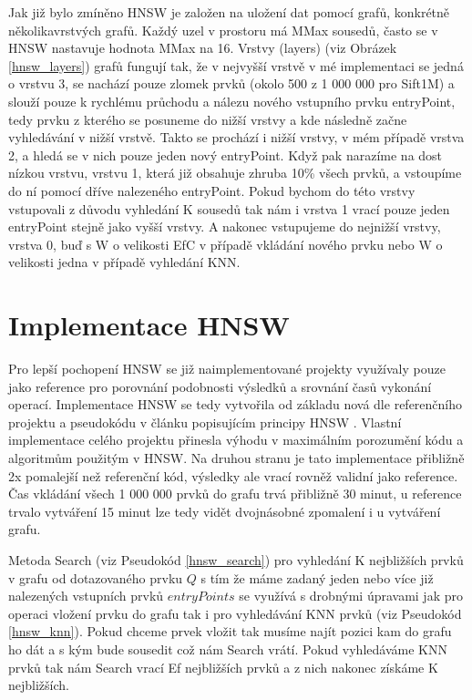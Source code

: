 \documentclass[czech,semestral,dept460,male,csharp,cpdeclaration]{diploma}
\begin{document}
		Jak již bylo zmíněno HNSW je založen na uložení dat pomocí grafů, konkrétně několikavrstvých grafů. Každý uzel v prostoru má MMax sousedů, často se v HNSW nastavuje hodnota MMax na 16. Vrstvy (layers) (viz Obrázek \ref{hnsw_layers}) grafů fungují tak, že v nejvyšší vrstvě v mé implementaci se jedná o vrstvu 3, se nachází pouze zlomek prvků (okolo 500 z 1 000 000 pro Sift1M) a slouží pouze k rychlému průchodu a nálezu nového vstupního prvku entryPoint, tedy prvku z kterého se posuneme do nižší vrstvy a kde následně začne vyhledávání v nižší vrstvě. Takto se prochází i nižší vrstvy, v mém případě vrstva 2, a hledá se v nich pouze jeden nový entryPoint. Když pak narazíme na dost nízkou vrstvu, vrstvu 1, která již obsahuje zhruba 10\% všech prvků, a vstoupíme do ní pomocí dříve nalezeného entryPoint. Pokud bychom do této vrstvy vstupovali z důvodu vyhledání K sousedů tak nám i vrstva 1 vrací pouze jeden entryPoint stejně jako vyšší vrstvy. A nakonec vstupujeme do nejnižší vrstvy, vrstva 0, buď s W o velikosti EfC v případě vkládání nového prvku nebo W o velikosti jedna v případě vyhledání KNN.
		
		\section{Implementace HNSW}
		
		Pro lepší pochopení HNSW se již naimplementované projekty \cite{git-hnswlib} \cite{git-hnsw} využívaly pouze jako reference pro porovnání podobnosti výsledků a srovnání časů vykonání operací. Implementace HNSW se tedy vytvořila od základu nová dle referenčního projektu a pseudokódu v článku popisujícím principy HNSW \cite{malkov2018efficient}. Vlastní implementace celého projektu přinesla výhodu v maximálním porozumění kódu a algoritmům použitým v HNSW. Na druhou stranu je tato implementace přibližně 2x pomalejší než referenční kód, výsledky ale vrací rovněž validní jako reference. Čas vkládání všech 1 000 000 prvků do grafu trvá přibližně 30 minut, u reference trvalo vytváření 15 minut lze tedy vidět dvojnásobné zpomalení i u vytváření grafu.
		
		\label{MS}
		Metoda Search (viz Pseudokód \ref{hnsw_search}) pro vyhledání K nejbližších prvků v grafu od dotazovaného prvku $Q$ s tím že máme zadaný jeden nebo více již nalezených vstupních prvků $entryPoints$ se využívá s drobnými úpravami jak pro operaci vložení prvku do grafu tak i pro vyhledávání KNN prvků (viz Pseudokód \ref{hnsw_knn}). Pokud chceme prvek vložit tak musíme najít pozici kam do grafu ho dát a s kým bude sousedit což nám Search vrátí. Pokud vyhledáváme KNN prvků tak nám Search vrací Ef nejbližších prvků a z nich nakonec získáme K nejbližších.
		
\end{document}
